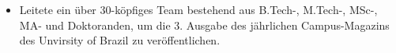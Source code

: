

\begin{itemize}
    \item Leitete ein über 30-köpfiges Team bestehend aus B.Tech-, M.Tech-, MSc-, MA- und Doktoranden, um die 3. Ausgabe des jährlichen Campus-Magazins des Unvirsity of Brazil zu veröffentlichen.
\end{itemize}
\divider 

